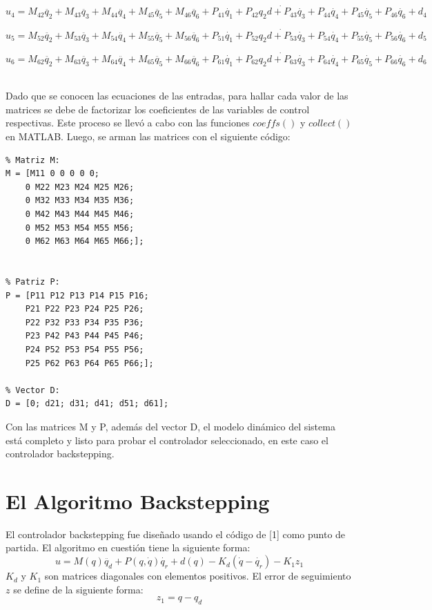 \documentclass[conference]{IEEEtran}
\begin{document}
\begin{equation}
    u_4 = M_{42}\ddot{q_2} + M_{43}\ddot{q_3} + M_{44}\ddot{q_4} + M_{45}\ddot{q_5} + M_{46}\ddot{q_6}+ P_{41}\dot{q_1} + P_{42}\dot{q_2d + P_{43}\dot{q_3}} + P_{44}\dot{q_4} + P_{45}\dot{q_5} + P_{46}\dot{q_6} +
    d_{4}
\end{equation}

\begin{equation}
    u_5 = M_{52}\ddot{q_2} + M_{53}\ddot{q_3} + M_{54}\ddot{q_4} + M_{55}\ddot{q_5} + M_{56}\ddot{q_6}+ P_{51}\dot{q_1} + P_{52}\dot{q_2d + P_{53}\dot{q_3}} + P_{54}\dot{q_4} + P_{55}\dot{q_5} + P_{56}\dot{q_6} +
    d_{5}
\end{equation}

\begin{equation}
    u_6 = M_{62}\ddot{q_2} + M_{63}\ddot{q_3} + M_{64}\ddot{q_4} + M_{65}\ddot{q_5} + M_{66}\ddot{q_6}+ P_{61}\dot{q_1} + P_{62}\dot{q_2d + P_{63}\dot{q_3}} + P_{64}\dot{q_4} + P_{65}\dot{q_5} + P_{66}\dot{q_6} +
    d_{6}
\end{equation}

\\
Dado que se conocen las ecuaciones de las entradas, para hallar cada valor de las matrices se debe de factorizar los coeficientes de las variables de control respectivas. Este proceso se llevó a cabo con las funciones $coeffs()$ y $collect()$ en MATLAB. 
Luego, se arman las matrices con el siguiente código:
\begin{lstlisting}
% Matriz M:
M = [M11 0 0 0 0 0;
    0 M22 M23 M24 M25 M26;
    0 M32 M33 M34 M35 M36;
    0 M42 M43 M44 M45 M46;
    0 M52 M53 M54 M55 M56;
    0 M62 M63 M64 M65 M66;];


% Patriz P:
P = [P11 P12 P13 P14 P15 P16;
    P21 P22 P23 P24 P25 P26;
    P22 P32 P33 P34 P35 P36;
    P23 P42 P43 P44 P45 P46;
    P24 P52 P53 P54 P55 P56;
    P25 P62 P63 P64 P65 P66;];

% Vector D:
D = [0; d21; d31; d41; d51; d61];
\end{lstlisting}
Con las matrices M y P, además del vector D, el modelo dinámico del sistema está completo y listo para probar el controlador seleccionado, en este caso el controlador backstepping.

\newpage
\twocolumn
\section{El Algoritmo Backstepping}
El controlador backstepping fue diseñado usando el código de [1] como punto de partida. El algoritmo en cuestión tiene la siguiente forma:
\begin{equation}
    u = M(q)\ddot{q_d} + P(q,\dot{q})\dot{q_r} + d(q) - K_d(\dot{q} - \dot{q_r}) - K_1 z_1
\end{equation}
$K_d$ y $K_1$ son matrices diagonales con elementos positivos. El error de seguimiento $z$ se define de la siguiente forma:
\begin{equation}
    z_1 = q - q_d
\end{equation}
\end{document}
